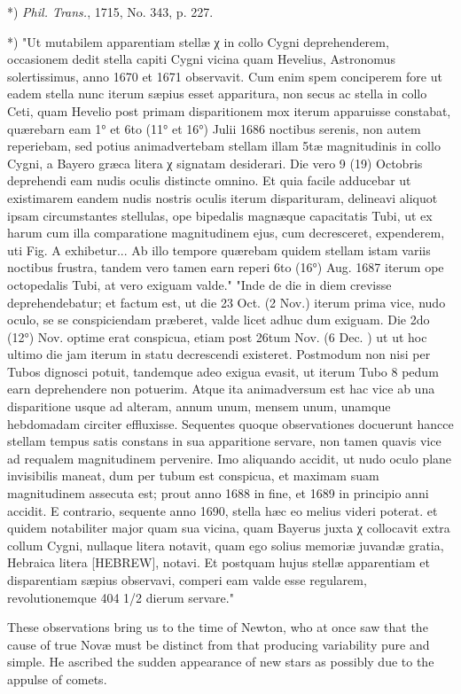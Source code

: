 \documentclass[a4paper, 12pt, oneside, polutonikogreek, english]{article}
\begin{document}
*) \emph{Phil. Trans.}, 1715, No. 343, p. 227.

*) "Ut mutabilem apparentiam stellæ χ in collo Cygni deprehenderem, occasionem dedit stella capiti Cygni vicina quam Hevelius, Astronomus solertissimus, anno 1670 et 1671 observavit. Cum enim spem conciperem fore ut eadem stella nunc iterum sæpius esset apparitura, non secus ac stella in collo Ceti, quam Hevelio post primam disparitionem mox iterum apparuisse constabat, quærebarn eam 1° et 6to (11° et 16°) Julii 1686 noctibus serenis, non autem reperiebam, sed potius animadvertebam stellam illam 5tæ magnitudinis in collo Cygni, a Bayero græca litera χ signatam desiderari. Die vero 9 (19) Octobris deprehendi eam nudis oculis distincte omnino. Et quia facile adducebar ut existimarem eandem nudis nostris oculis iterum disparituram, delineavi aliquot ipsam circumstantes stellulas, ope bipedalis magnæque capacitatis Tubi, ut ex harum cum illa comparatione magnitudinem ejus, cum decresceret, expenderem, uti Fig. A exhibetur... Ab illo tempore quærebam quidem stellam istam variis noctibus frustra, tandem vero tamen earn reperi 6to (16°) Aug. 1687 iterum ope octopedalis Tubi, at vero exiguam valde." "Inde de die in diem crevisse deprehendebatur; et factum est, ut die 23 Oct. (2 Nov.) iterum prima vice, nudo oculo, se se conspiciendam præberet, valde licet adhuc dum exiguam. Die 2do (12°) Nov. optime erat conspicua, etiam post 26tum Nov. (6 Dec. ) ut ut hoc ultimo die jam iterum in statu decrescendi existeret. Postmodum non nisi per Tubos dignosci potuit, tandemque adeo exigua evasit, ut iterum Tubo 8 pedum earn deprehendere non potuerim. Atque ita animadversum est hac vice ab una disparitione usque ad alteram, annum unum, mensem unum, unamque hebdomadam circiter effluxisse. Sequentes quoque observationes docuerunt hancce stellam tempus satis constans in sua apparitione servare, non tamen quavis vice ad requalem magnitudinem pervenire. Imo aliquando accidit, ut nudo oculo plane invisibilis maneat, dum per tubum est conspicua, et maximam suam magnitudinem assecuta est; prout anno 1688 in fine, et 1689 in principio anni accidit. E contrario, sequente anno 1690, stella hæc eo melius videri poterat. et quidem notabiliter major quam sua vicina, quam Bayerus juxta χ collocavit extra collum Cygni, nullaque litera notavit, quam ego solius memoriæ juvandæ gratia, Hebraica litera [HEBREW], notavi. Et postquam hujus stellæ apparentiam et disparentiam sæpius observavi, comperi eam valde esse regularem, revolutionemque 404 1/2 dierum servare."

These observations bring us to the time of Newton, who at once saw that the cause of true Novæ must be distinct from that producing variability pure and simple. He ascribed the sudden appearance of new stars as possibly due to the appulse of comets.
\end{document}

